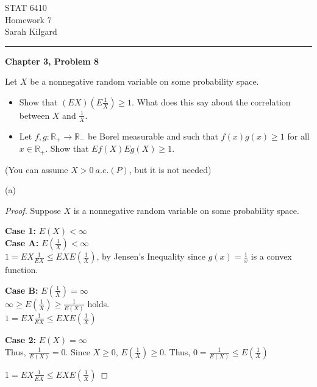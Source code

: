 \documentclass[12pt,letterpaper, onecolumn]{exam}
\newcommand{\real}{\mathbb{R}}
\begin{document}
\begingroup  
    \centering
    \LARGE STAT 6410\\
    \LARGE Homework 7\\[0.5em]
    \large Sarah Kilgard\par
\endgroup
\rule{\textwidth}{0.4pt}
\pointsdroppedatright   %
\printanswers
\renewcommand{\solutiontitle}{\noindent\textbf{Ans:}\enspace}   %

\begin{questions}
    \question \textbf{Chapter 3, Problem 8}

    Let $X$ be a nonnegative random variable on some probability space.
    \begin{itemize}
        \item[(a)] Show that $(EX)(E\frac{1}{X}) \geq 1$. What does this say about the correlation between $X$ and $\frac{1}{X}$.
        \item[(b)] Let $f, g: \real_{+} \to \real_{-}$ be Borel measurable and such that $f(x)g(x) \geq 1$ for all $x \in \real_{+}$. Show that $Ef(X)Eg(X) \geq 1$.
    \end{itemize}

    
    (You can assume $X > 0 \: a.e.(P)$, but it is not needed)
    \begin{solution}
    (a) \begin{proof}
        Suppose $X$ is a nonnegative random variable on some probability space.

        \textbf{Case 1:} $E(X) < \infty$\\
        \textbf{Case A:} $E(\tfrac{1}{X}) < \infty$\\
        $1 = EX\frac{1}{EX} \leq EX E(\tfrac{1}{X})$, by Jensen's Inequality since $g(x) = \frac{1}{x}$ is a convex function. 

        \textbf{Case B:} $E(\tfrac{1}{X}) = \infty$ \\
        $\infty \geq E(\tfrac{1}{X}) \geq \tfrac{1}{E(X)}$ holds. \\
        $1 = EX\frac{1}{EX} \leq EX E(\tfrac{1}{X})$
        
        \textbf{Case 2:} $E(X) = \infty$ \\
        Thus, $\frac{1}{E(X)} = 0$. Since $X \geq 0$, $E(\tfrac{1}{X}) \geq 0$. Thus, $0 = \frac{1}{E(X)} \leq E(\tfrac{1}{X})$

         $1 = EX\frac{1}{EX} \leq EX E(\tfrac{1}{X})$
    \end{proof}


\end{solution}
\end{questions}
\end{document}
